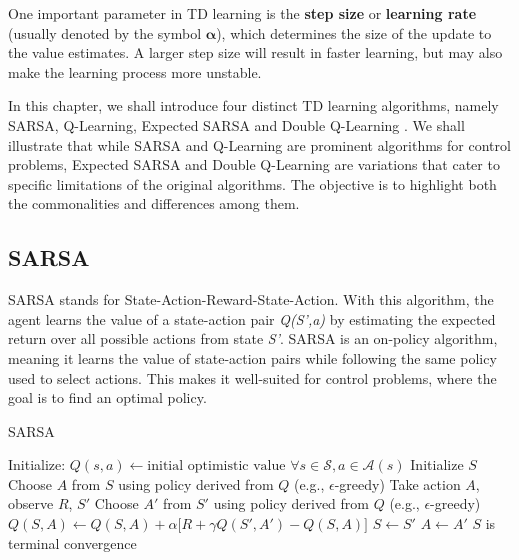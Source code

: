 One important parameter in TD learning is the \textbf{step size} or \textbf{learning rate} (usually denoted by the symbol $\bm{\alpha}$), which determines the size of the update to the value estimates. A larger step size will result in faster learning, but may also make the learning process more unstable.

In this chapter, we shall introduce four distinct TD learning algorithms, namely SARSA, Q-Learning, Expected SARSA and Double Q-Learning  \citep{RLSuttonBarto}. We shall illustrate that while SARSA and Q-Learning are prominent algorithms for control problems, Expected SARSA and Double Q-Learning are variations that cater to specific limitations of the original algorithms. The objective is to highlight both the commonalities and differences among them.

\subsection{SARSA}
SARSA stands for State-Action-Reward-State-Action. With this algorithm, the agent learns the value of a state-action pair \textit{Q(S',a)} by estimating the expected return over all possible actions from state \textit{S'}. SARSA is an on-policy algorithm, meaning it learns the value of state-action pairs while following the same policy used to select actions. This makes it well-suited for control problems, where the goal is to find an optimal policy.
\begin{algorithm}
\caption{SARSA}\label{algo:S}
\begin{algorithmic}[1]
\State Initialize:
\State \hspace{0.5cm} $Q(s,a) \gets \text{initial optimistic value } \forall s\in \mathcal{S}, a\in \mathcal{A}(s)$
\Repeat
\State Initialize $S$
\State Choose $A$ from $S$ using policy derived from $Q$ (e.g., $\epsilon$-greedy)
\Repeat
\State Take action $A$, observe $R$, $S'$
\State Choose $A'$ from $S'$ using policy derived from $Q$ (e.g., $\epsilon$-greedy)
\State $Q(S,A) \gets Q(S,A) + \alpha \big[ R + \gamma Q(S',A') - Q(S,A) \big]$
\State $S \gets S'$
\State $A \gets A'$
\Until $S$ is terminal
\Until convergence
\end{algorithmic}
\end{algorithm}

